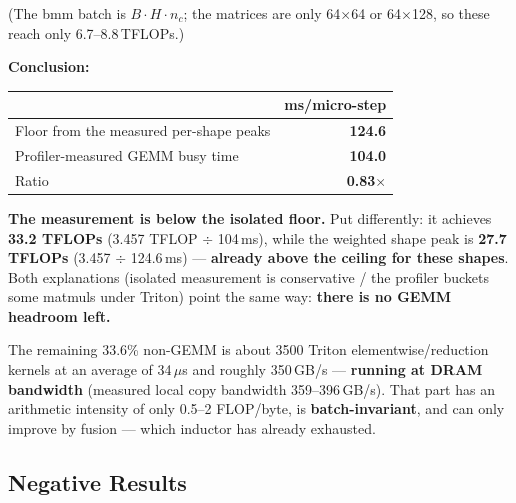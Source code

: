 \documentclass[11pt,openany]{article}
\begin{document}
(The bmm batch is $B{\cdot}H{\cdot}n_c$; the matrices are only 64$\times$64 or 64$\times$128, so
these reach only 6.7--8.8\,TFLOPs.)

\textbf{Conclusion:}

\begin{center}\small
{}
\begin{tabular}{@{}lr@{}}
\toprule
 & \textbf{ms/micro-step} \\
\midrule
Floor from the measured per-shape peaks & \textbf{124.6} \\
Profiler-measured GEMM busy time & \textbf{104.0} \\
Ratio & \textbf{0.83$\times$} \\
\bottomrule
\end{tabular}
\end{center}

\textbf{The measurement is below the isolated floor.} Put differently: it achieves
\textbf{33.2 TFLOPs} (3.457 TFLOP $\div$ 104\,ms), while the weighted shape peak is
\textbf{27.7 TFLOPs} (3.457 $\div$ 124.6\,ms) --- \textbf{already above the ceiling for these
shapes}. Both explanations (isolated measurement is conservative / the profiler buckets some
matmuls under Triton) point the same way: \textbf{there is no GEMM headroom left.}

The remaining 33.6\% non-GEMM is about 3500 Triton elementwise/reduction kernels at an average
of 34\,$\mu$s and roughly 350\,GB/s --- \textbf{running at DRAM bandwidth} (measured local copy
bandwidth 359--396\,GB/s). That part has an arithmetic intensity of only 0.5--2 FLOP/byte, is
\textbf{batch-invariant}, and can only improve by fusion --- which inductor has already
exhausted.

\subsection{Negative Results}
\label{sec:en-eng-neg}
\end{document}
